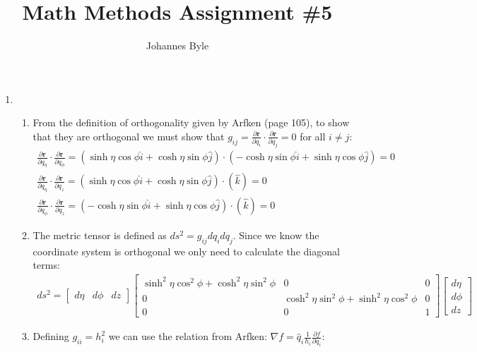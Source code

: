 \documentclass[12pt]{article}
\title{Math Methods Assignment \#5}
\author{Johannes Byle}
\newcommand{\p}[2]{\frac{\partial #1}{\partial #2}}
\begin{document}
  \maketitle
  \begin{enumerate}
    \item
    \begin{enumerate}
      \item From the definition of orthogonality given by Arfken (page 105), to show that they are orthogonal we must show that $g_{ij}=\p{\pmb{r}}{q_i}\cdot\p{\pmb{r}}{q_j}=0$ for all $i\neq j$:
      \begin{gather*}
        \p{\pmb{r}}{q_{\eta}}\cdot\p{\pmb{r}}{q_{\phi}}=
        \left(\sinh\eta\cos\phi\hat{i}+\cosh\eta\sin\phi\hat{j}\right)\cdot
        \left(-\cosh\eta\sin\phi\hat{i}+\sinh\eta\cos\phi\hat{j}\right)=0\\
        \p{\pmb{r}}{q_{\eta}}\cdot\p{\pmb{r}}{q_z}=
        \left(\sinh\eta\cos\phi\hat{i}+\cosh\eta\sin\phi\hat{j}\right)\cdot
        \left(\hat{k}\right)=0\\
        \p{\pmb{r}}{q_{\phi}}\cdot\p{\pmb{r}}{q_z}=
        \left(-\cosh\eta\sin\phi\hat{i}+\sinh\eta\cos\phi\hat{j}\right)\cdot
        \left(\hat{k}\right)=0
      \end{gather*}
      \item The metric tensor is defined as $ds^2=g_{ij}dq_i dq_j$.
      Since we know the coordinate system is orthogonal we only need to calculate the diagonal terms:
      \begin{gather*}
        ds^2=
        \begin{bmatrix}
          d\eta & d\phi & dz
        \end{bmatrix}
        \begin{bmatrix}
          \sinh^2\eta\cos^2\phi+\cosh^2\eta\sin^2\phi & 0                                           & 0 \\
          0                                           & \cosh^2\eta\sin^2\phi+\sinh^2\eta\cos^2\phi & 0 \\
          0                                           & 0                                           & 1
        \end{bmatrix}
        \begin{bmatrix}
          d\eta \\
          d\phi \\
          dz
        \end{bmatrix}
      \end{gather*}
      \item Defining $g_{ii}=h_i^2$ we can use the relation from Arfken: $\nabla f=\hat{q}_i\frac{1}{h_i}\p{f}{q_i}$:

\end{enumerate}
\end{enumerate}
\end{document}
